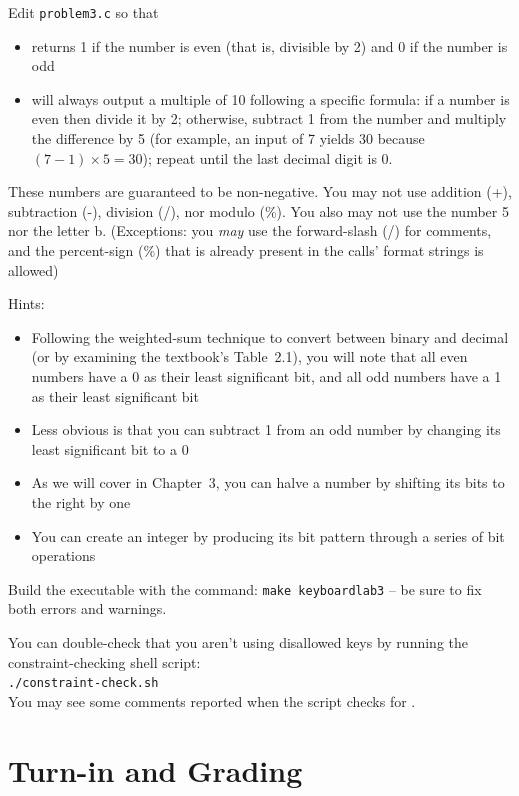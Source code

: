 Edit \texttt{problem3.c} so that
\begin{itemize}
\item {} returns 1 if the number is even (that is,
    divisible by 2) and 0 if the number is odd
\item {} will always output a multiple of
    10 following a specific formula: if a number is even then divide it by
    2; otherwise, subtract 1 from the number and multiply the difference
    by 5 (for example, an input of 7 yields 30 because $(7-1) \times 5 = 30$);
    repeat until the last decimal digit is 0.
\end{itemize}
These numbers are guaranteed to be non-negative. You may not use addition (+),
subtraction (-), division (/), nor modulo (\%). You also may not use the
number 5 nor the letter b. (Exceptions: you \textit{may} use the forward-slash
(/) for comments, and the percent-sign (\%) that is already present in the
 calls' format strings is allowed)

Hints:
\begin{itemize}
\item Following the weighted-sum technique to convert between binary and
    decimal (or by examining the textbook's Table~2.1), you will note that all
    even numbers have a 0 as their least significant bit, and all odd numbers
    have a 1 as their least significant bit
\item Less obvious is that you can subtract 1 from an odd number by changing
    its least significant bit to a 0
\item As we will cover in Chapter~3, you can halve a number by shifting its
    bits to the right by one
\item You can create an integer by producing its bit pattern through a series
    of bit operations
\end{itemize}

Build the executable with the command: \texttt{make keyboardlab3} -- be sure to
fix both errors and warnings.

You can double-check that you aren't using disallowed keys by running the
constraint-checking shell script: \\
\texttt{./constraint-check.sh} \\
You may see some comments reported when the script checks for
\textquotesingle *\textquotesingle.


\section*{Turn-in and Grading}

